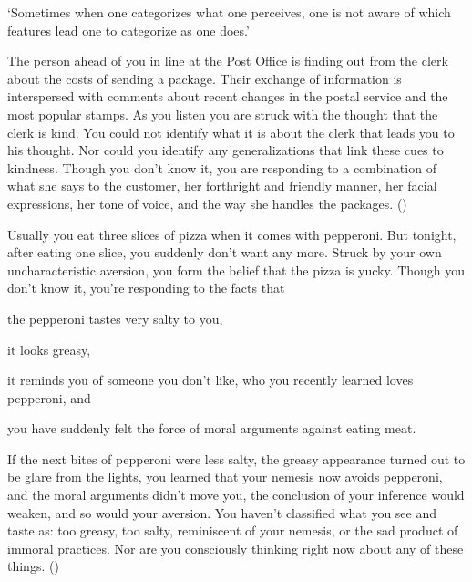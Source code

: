 \documentclass[10pt]{article}
\begin{document}
`Sometimes when one categorizes what one perceives, one is not aware of which features lead one to categorize as one does.' \citeyear[9]{Siegel:2019aa}

\begin{scenario}[Kindness]
  The person ahead of you in line at the Post Office is finding out from the clerk about the costs of sending a package. Their exchange of information is interspersed with comments about recent changes in the postal service and the most popular stamps. As you listen you are struck with the thought that the clerk is kind. You could not identify what it is about the clerk that leads you to his thought. Nor could you identify any generalizations that link these cues to kindness. Though you don’t know it, you are responding to a combination of what she says to the customer, her forthright and friendly manner, her facial expressions, her tone of voice, and the way she handles the packages.\nolinebreak
  \mbox{}\hfill\mbox{(\citeyear[9--10]{Siegel:2019aa})}
\end{scenario}


\begin{scenario}[Pepperoni]
  Usually you eat three slices of pizza when it comes with pepperoni.
  But tonight, after eating one slice, you suddenly don't want any more.
  Struck by your own uncharacteristic aversion, you form the belief that the pizza is yucky.
  Though you don't know it, you’re responding to the facts that
  \begin{enumerate*}[label=(\roman*)]
  \item the pepperoni tastes very salty to you,
  \item it looks greasy,
  \item it reminds you of someone you don’t like, who you recently learned loves pepperoni, and
  \item you have suddenly felt the force of moral arguments against eating meat.
  \end{enumerate*}
  If the next bites of pepperoni were less salty, the greasy appearance turned out to be glare from the lights, you learned that your nemesis now avoids pepperoni, and the moral arguments didn't move you, the conclusion of your inference would weaken, and so would your aversion.
  You haven't classified what you see and taste as: too greasy, too salty, reminiscent of your nemesis, or the sad product of immoral practices.
  Nor are you consciously thinking right now about any of these things.\nolinebreak
  \mbox{}\hfill\mbox{(\citeyear[11]{Siegel:2019aa})}
\end{scenario}
\end{document}
